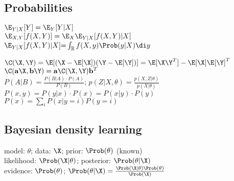 \subsection*{Probabilities}
$\E_{Y|X}[Y]=\E_{Y}[Y|X]$\\
$\E_{X,Y}[f(X,Y)]=\E_{X}\E_{Y|X}[f(X,Y)|X]$
$\E_{Y|X}[f(X,Y)|X]{=}\int_\mathbb{R}f(X,y)\Prob(y|X)\di y$


$\C(\X,\Y)=\E[(\X-\E[\X])(\Y-\E[\Y])] = \E[\X\Y^T]-\E[\X]\E[\Y]^T$ \\
$\C(\mathbf{a}\X,\mathbf{b}\Y)=\mathbf{a}\C(\X,\Y)\mathbf{b}^T$\\
$P(A|B) = \frac{P(B|A) \cdot P(A)}{P(B)}$; $p(Z|X,\theta) = \frac{p(X,Z|\theta)}{p(X|\theta)}$\\
$P(x,y) = P(y|x) \cdot  P(x) = P(x|y) \cdot P(y)$
$P(x)=\sum_i P(x|y=i)P(y=i)$
\subsection*{Bayesian density learning}
model: $\theta$;
data: $\X$;
prior: $\Prob(\theta)$ (known)\\
likelihood: $\Prob(\X|\theta)$;
posterior:
$\Prob(\theta|\X)$\\
evidence:
$\Prob(\theta)$;
$\Prob(\theta|\X)=\frac{\Prob(\X|\theta)\Prob(\theta)}{\Prob(\X)}$
